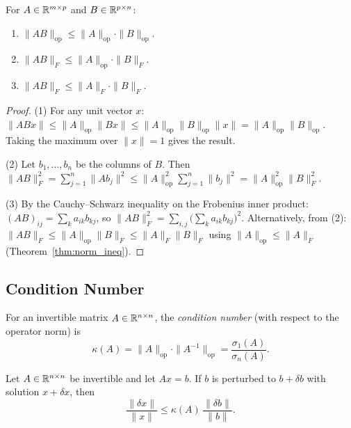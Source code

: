 \documentclass[11pt,a4paper]{article}
\begin{document}
\begin{theorem}[Submultiplicativity]
\label{thm:submult}
For $A \in \mathbb{R}^{m \times p}$ and $B \in \mathbb{R}^{p \times n}$:
\begin{enumerate}[nosep]
  \item $\|AB\|_{\mathrm{op}} \leq \|A\|_{\mathrm{op}} \cdot \|B\|_{\mathrm{op}}$.
  \item $\|AB\|_F \leq \|A\|_{\mathrm{op}} \cdot \|B\|_F$.
  \item $\|AB\|_F \leq \|A\|_F \cdot \|B\|_F$.
\end{enumerate}
\end{theorem}

\begin{proof}
(1) For any unit vector $x$:
$\|ABx\| \leq \|A\|_{\mathrm{op}} \|Bx\|
\leq \|A\|_{\mathrm{op}} \|B\|_{\mathrm{op}} \|x\|
= \|A\|_{\mathrm{op}} \|B\|_{\mathrm{op}}$.
Taking the maximum over $\|x\| = 1$ gives the result.

(2) Let $b_1, \ldots, b_n$ be the columns of $B$.  Then
$\|AB\|_F^2 = \sum_{j=1}^n \|Ab_j\|^2
\leq \|A\|_{\mathrm{op}}^2 \sum_{j=1}^n \|b_j\|^2
= \|A\|_{\mathrm{op}}^2 \|B\|_F^2$.

(3) By the Cauchy--Schwarz inequality on the Frobenius inner product:
$(AB)_{ij} = \sum_k a_{ik} b_{kj}$, so
$\|AB\|_F^2 = \sum_{i,j} \bigl(\sum_k a_{ik} b_{kj}\bigr)^2$.
Alternatively, from (2): $\|AB\|_F \leq \|A\|_{\mathrm{op}} \|B\|_F
\leq \|A\|_F \|B\|_F$ using
$\|A\|_{\mathrm{op}} \leq \|A\|_F$ (Theorem~\ref{thm:norm_ineq}).
\end{proof}

\subsection{Condition Number}

\begin{definition}
\label{def:condition_number}
For an invertible matrix $A \in \mathbb{R}^{n \times n}$, the
\emph{condition number} (with respect to the operator norm) is
\[
  \kappa(A) = \|A\|_{\mathrm{op}} \cdot \|A^{-1}\|_{\mathrm{op}}
  = \frac{\sigma_1(A)}{\sigma_n(A)}.
\]
\end{definition}

\begin{theorem}
\label{thm:sensitivity}
Let $A \in \mathbb{R}^{n \times n}$ be invertible and let $Ax = b$.  If
$b$ is perturbed to $b + \delta b$ with solution $x + \delta x$, then
\[
  \frac{\|\delta x\|}{\|x\|}
  \leq \kappa(A)\, \frac{\|\delta b\|}{\|b\|}.
\]
\end{theorem}
\end{document}
